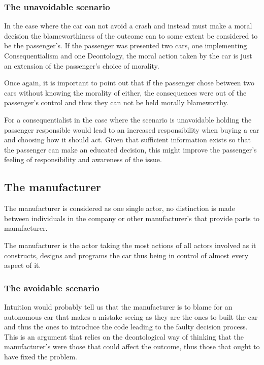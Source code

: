 \subsubsection{The unavoidable scenario}
In the case where the car can not avoid a crash and instead must make a moral
decision the blameworthiness of the outcome can to some extent be considered to
be the passenger's. If the passenger was presented two cars, one implementing
Consequentialism and one Deontology, the moral action taken by the car is just
an extension of the passenger's choice of morality.

Once again, it is important to point out that if the passenger chose between two
cars without knowing the morality of either, the consequences were out of the
passenger's control and thus they can not be held morally blameworthy.

For a consequentialist in the case where the scenario is unavoidable holding the
passenger responsible would lead to an increased responsibility when buying a
car and choosing how it should act. Given that sufficient information exists so
that the passenger can make an educated decision, this might improve the
passenger's feeling of responsibility and awareness of the issue.

\subsection{The manufacturer}\label{sec:manufacturer}
The manufacturer is considered as one single actor, no distinction is made between
individuals in the company or other manufacturer's that provide parts to
manufacturer.

The manufacturer is the actor taking the most actions of all actors involved as
it constructs, designs and programs the car thus being in control of almost
every aspect of it.

\subsubsection{The avoidable scenario}
Intuition would probably tell us that the manufacturer is to blame for an
autonomous car that makes a mistake seeing as they are the ones to built the car
and thus the ones to introduce the code leading to the faulty decision process.
This is an argument that relies on the deontological way of thinking that the
manufacturer's were those that could affect the outcome, thus those that
ought to have fixed the problem.


